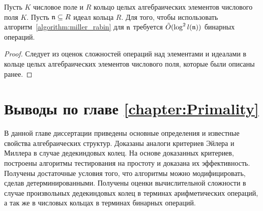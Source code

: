 \documentclass[_00_dissertation.tex]{subfiles}
\begin{document}
\begin{proposition}
    Пусть $K$ числовое поле и $R$ кольцо целых алгебраических элементов числового поля $K$.
    Пусть $\mathfrak{n} \subseteq R$ идеал кольца $R$.
    Для того, чтобы использовать алгоритм~\ref{algorithm:miller_rabin} для $\mathfrak{n}$ требуется $\tilde{O}(\log^2 l(\mathfrak{n}))$ бинарных операций.
\end{proposition}
\begin{proof}
    Следует из оценок сложностей операций над элементами и идеалами в кольце целых алгебраических элементов числового поля, которые были описаны ранее.
\end{proof}

\section*{Выводы по главе \ref{chapter:Primality}}

В данной главе диссертации приведены основные определения и известные свойства алгебраических структур.
Доказаны аналоги критериев Эйлера и Миллера в случае дедекиндовых колец.
На основе доказанных критериев, построены алгоритмы тестирования на простоту и доказана их эффективность.
Получены достаточные условия того, что алгоритмы можно модифицировать, сделав детерминированными.
Получены оценки вычислительной сложности в случае произвольных дедекиндовых колец в терминах арифметических операций, а так же в числовых кольцах в терминах бинарных операций.

\onlyinsubfile{
    
}
\end{document}
